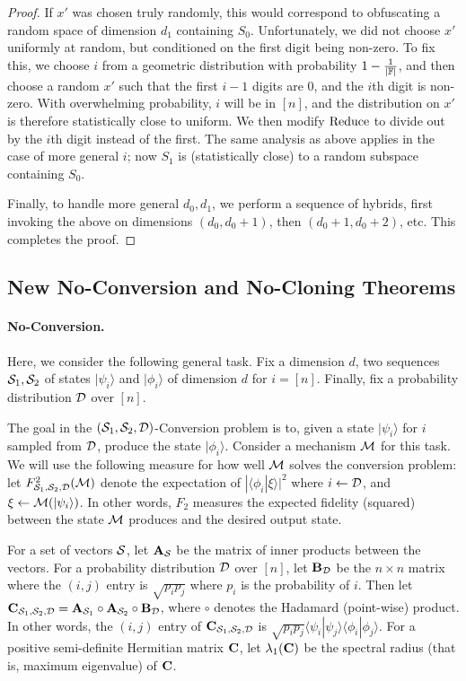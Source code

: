 \begin{proof}
	If $x'$ was chosen truly randomly, this would correspond to obfuscating a random space of dimension $d_1$ containing $S_0$.  Unfortunately, we did not choose $x'$ uniformly at random, but conditioned on the first digit being non-zero.  To fix this, we choose $i$ from a geometric distribution with probability $1-\frac{1}{|{\mathbb F}|}$, and then choose a random $x'$ such that the first $i-1$ digits are 0, and the $i$th digit is non-zero.   With overwhelming probability, $i$ will be in $[n]$, and the distribution on $x'$ is therefore statistically close to uniform.  We then modify ${\rm Reduce}$ to divide out by the $i$th digit instead of the first.  The same analysis as above applies in the case of more general $i$; now $S_1$ is (statistically close) to a random subspace containing $S_0$.
	
	\medskip
	
	Finally, to handle more general $d_0,d_1$, we perform a sequence of hybrids, first invoking the above on dimensions $(d_0,d_0+1)$, then $(d_0+1,d_0+2)$, etc.  This completes the proof.\end{proof}

\subsection{New No-Conversion and No-Cloning Theorems}

\paragraph{No-Conversion.} Here, we consider the following general task.  Fix a dimension $d$, two sequences ${\mathcal{S}}_1,{\mathcal{S}}_2$ of states $|\psi_i\rangle$ and $|\phi_i\rangle$ of dimension $d$ for $i=[n]$.  Finally, fix a probability distribution ${\mathcal{D}}$ over $[n]$.  

The goal in the $({\mathcal{S}}_1,{\mathcal{S}}_2,{\mathcal{D}})$-Conversion problem is to, given a state $|\psi_i\rangle$ for $i$ sampled from ${\mathcal{D}}$, produce the state $|\phi_i\rangle$.  Consider a mechanism ${\mathcal{M}}$ for this task.  We will use the following measure for how well ${\mathcal{M}}$ solves the conversion problem: let $F^2_{{\mathcal{S}}_1,{\mathcal{S}}_2,{\mathcal{D}}}({\mathcal{M}})$ denote the expectation of $|\langle \phi_i | \xi \rangle |^2$ where $i\gets {\mathcal{D}}$, and $\xi\gets {\mathcal{M}}(|\psi_i\rangle)$.  In other words, $F_2$ measures the expected fidelity (squared) between the state ${\mathcal{M}}$ produces and the desired output state.

For a set of vectors ${\mathcal{S}}$, let ${\mathbf{A}}_{{\mathcal{S}}}$ be the matrix of inner products between the vectors.  For a probability distribution ${\mathcal{D}}$ over $[n]$, let ${\mathbf{B}}_{{\mathcal{D}}}$ be the $n\times n$ matrix where the $(i,j)$ entry is $\sqrt{p_i p_j}$ where $p_i$ is the probability of $i$.  Then let ${\mathbf{C}}_{{\mathcal{S}}_1,{\mathcal{S}}_2,{\mathcal{D}}}={\mathbf{A}}_{{\mathcal{S}}_1}\circ {\mathbf{A}}_{{\mathcal{S}}_2}\circ {\mathbf{B}}_{\mathcal{D}}$, where $\circ$ denotes the Hadamard (point-wise) product.  In other words, the $(i,j)$ entry of ${\mathbf{C}}_{{\mathcal{S}}_1,{\mathcal{S}}_2,{\mathcal{D}}}$ is $\sqrt{p_i p_j}\langle \psi_i | \psi_j \rangle \langle \phi_i | \phi_j \rangle$.  For a positive semi-definite Hermitian matrix ${\mathbf{C}}$, let $\lambda_1({\mathbf{C}})$ be the spectral radius (that is, maximum eigenvalue) of ${\mathbf{C}}$.

